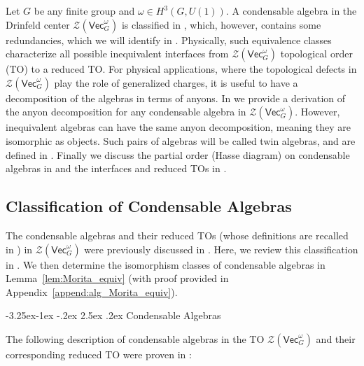 \documentclass[aps,twocolumn,prx,floatfix,preprintnumbers, nofootinbib,10pt]{revtex4-2}
\makeatletter
\numberwithin{equation}{section}
\theoremstyle{definition}
\newcommand{\cZ}{\mathcal{Z}}
\renewcommand{\Vec}{\mathsf{Vec}}
\renewcommand\subsubsection{\@startsection{subsubsection}{3}{\z@}%
                                     {-3.25ex\@plus -1ex \@minus -.2ex}%
                                     {2.5ex \@plus .2ex}%
                                     {\centering\itshape\bfseries\small}}
\makeatother
\begin{document}
Let $G$ be any finite group and $\omega\in H^3(G, U(1))$.
A condensable algebra in the Drinfeld center $\cZ(\Vec_G^\omega)$ is classified in \cite{davydov2017lagrangian, Hannah:2023tae}, which, however, contains some redundancies, which we will identify in .    
Physically, such equivalence classes characterize all possible inequivalent interfaces from $\cZ(\Vec_G^\omega)$ topological order (TO) to a reduced TO. 
For physical applications, where the topological defects in $\cZ (\Vec_G^\omega)$ play the role of generalized charges, it is useful to have a decomposition of the algebras in terms of anyons. 
In  we provide a derivation of the anyon decomposition for any condensable algebra in $\cZ (\Vec_G^\omega)$. However, inequivalent algebras can have the same anyon decomposition, meaning they are isomorphic as objects. Such pairs of algebras will be called twin algebras, and are defined in . Finally we discuss the partial order (Hasse diagram) on condensable algebras in  and the interfaces and reduced TOs in . 




\subsection{Classification of Condensable Algebras} \label{sec:CondAlg_class}

The condensable algebras and their reduced TOs (whose definitions are recalled in )  
in $\cZ(\Vec_G^\omega)$ were previously discussed in \cite{Davydov2009ModularIF, davydov2017lagrangian, Hannah:2023tae}. 
Here, we review this classification in . We then determine the  isomorphism classes of condensable algebras in Lemma~\ref{lem:Morita_equiv} (with proof provided in Appendix~\ref{append:alg_Morita_equiv}). 


\subsubsection{Condensable Algebras}
\label{sec:review-algebras}

The following description of condensable algebras in the TO $\cZ(\Vec_G^\omega)$ and their corresponding reduced TO were proven in \cite{davydov2017lagrangian}:
\end{document}
